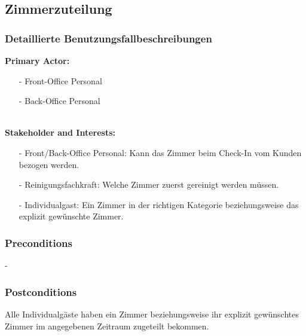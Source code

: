 \documentclass[./detailed_overview_usecases.tex]{subfiles}
\begin{document}
    \subsection{Zimmerzuteilung}
    \subsubsection{Detaillierte Benutzungsfallbeschreibungen}
    \textbf{Primary Actor: }
    \begin{itemize}
        \item[-] Front-Office Personal
        \item[-] Back-Office Personal
    \end{itemize}
    \\
    \textbf{Stakeholder and Interests:}
    \begin{itemize}
        \item[-] Front/Back-Office Personal: Kann das Zimmer beim Check-In vom Kunden bezogen werden.
        \item[-] Reinigungsfachkraft: Welche Zimmer zuerst gereinigt werden müssen.
        \item[-] Individualgast: Ein Zimmer in der richtigen Kategorie beziehungsweise das explizit gewünschte Zimmer.
    \end{itemize}

    \subsubsection*{Preconditions}
    -
    \subsubsection*{Postconditions}
    Alle Individualgäste haben ein Zimmer beziehungsweise ihr explizit gewünschtes Zimmer im angegebenen Zeitraum zugeteilt bekommen.
\end{document}
